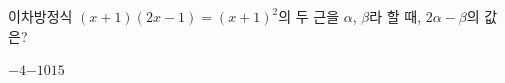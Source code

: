 이차방정식 $(x+1)(2x-1)=(x+1)^2$의 두 근을 $\alpha$, $\beta$라 할 때, $2\alpha-\beta$의 값은? \cond{$\alpha>\beta$}
\begin{choices32}{$-4$}{$-1$}{$0$}{$1$}{$5$}\end{choices32}
